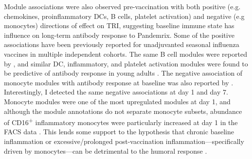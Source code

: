 Module associations were also observed pre-vaccination with both positive (e.g. chemokines, proinflammatory \glspl{DC}, B cells, platelet activation) and negative (e.g monocytes) directions of effect on \gls{TRI}, suggesting baseline immune state has influence on long-term antibody response to Pandemrix.
Some of the positive associations have been previously reported for unadjuvanted seasonal influenza vaccines in multiple independent cohorts.
The same B cell modules were reported by \textcite{nakaya2015SystemsAnalysisImmunity}, 
and similar \gls{DC}, inflammatory, and platelet activation modules were found to be predictive of antibody response in young adults \autocite{hipc-chisignaturesprojectteam2017MulticohortAnalysisReveals}.
The negative association of monocyte modules with antibody response at baseline was also reported by \textcite{nakaya2015SystemsAnalysisImmunity}.
Interestingly, I detected the same negative associations at day 1 and day 7.
Monocyte modules were one of the most upregulated modules at day 1,
and although the module annotations do not separate monocyte subsets,
abundance of CD16\textsuperscript{+} inflammatory monocytes were particularly increased at day 1 in the \gls{FACS} data \autocite{sobolev2016AdjuvantedInfluenzaH1N1Vaccination}.
This lends some support to the hypothesis that chronic baseline inflammation or excessive/prolonged post-vaccination inflammation---specifically driven by monocytes---can be detrimental to the humoral response \autocite{mitchell2012SuppressionVaccineImmunity,mohanty2015ProlongedProinflammatoryCytokine,nakaya2015SystemsAnalysisImmunity}.

%

